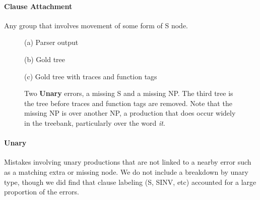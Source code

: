 \paragraph{Clause Attachment}
Any group that involves movement of some form of S node.

\begin{figure}
\begin{center}

\vspace{3mm}
(a) Parser output

\vspace{6mm}


\vspace{3mm}
(b) Gold tree

\vspace{6mm}


\vspace{3mm}
(c) Gold tree with traces and function tags
\end{center}
\derivspace
\caption{
	\label{fig:unary}
	Two \textbf{Unary} errors, a missing S and a missing NP.  The third tree is
	the \ptb tree before traces and function tags are removed.  Note that the
	missing NP is over another NP, a production that does occur widely in the
	treebank, particularly over the word \emph{it}.
}
\derivaftercompress
\end{figure}

\paragraph{Unary}
Mistakes involving unary productions that are not linked to a nearby error  such as a matching extra or missing node.
We do not include a breakdown by unary type, though we did find that clause labeling (S, SINV, etc) accounted for a large proportion of the errors.

